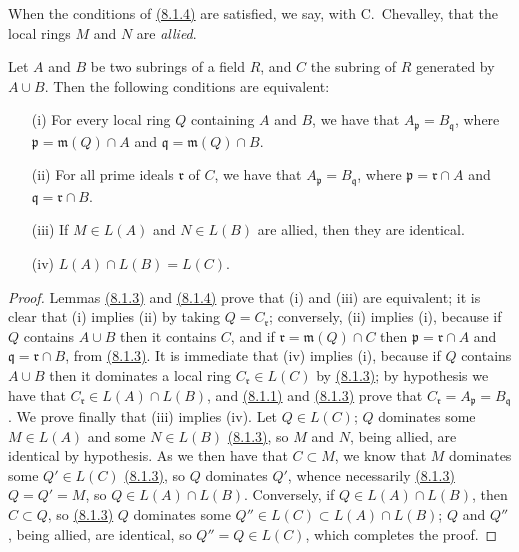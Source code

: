 When the conditions of \hyperref[lem-1.8.1.4]{(8.1.4)} are satisfied, we say, with C.~Chevalley,
that the local rings $M$ and $N$ are {\it allied}.

\begin{prop}[8.1.5]
\label{prop-1.8.1.5}
Let $A$ and $B$ be two subrings of a field $R$,
and $C$ the subring of $R$ generated by $A\cup B$. Then the following
conditions are equivalent:
\begin{itemize}
  \item[{\rm(i)}] For every local ring $Q$ containing $A$ and $B$, we have that
        $A_\mathfrak{p}=B_\mathfrak{q}$, where $\mathfrak{p}=\mathfrak{m}(Q)\cap A$ and
        $\mathfrak{q}=\mathfrak{m}(Q)\cap B$.
  \item[{\rm(ii)}] For all prime ideals $\mathfrak{r}$ of $C$, we have that
        $A_\mathfrak{p}=B_\mathfrak{q}$, where $\mathfrak{p}=\mathfrak{r}\cap A$ and
        $\mathfrak{q}=\mathfrak{r}\cap B$.
  \item[{\rm(iii)}] If $M\in L(A)$ and $N\in L(B)$ are allied, then they are identical.
  \item[{\rm(iv)}] $L(A)\cap L(B)=L(C)$.
\end{itemize}
\end{prop}

\begin{proof}
\label{proof-prop-1.8.1.5}
Lemmas \hyperref[lem-1.8.1.3]{(8.1.3)} and \hyperref[lem-1.8.1.4]{(8.1.4)} prove that (i) and (iii) are equivalent; it
is clear that (i) implies (ii) by taking $Q=C_\mathfrak{r}$; conversely, (ii)
implies (i), because if $Q$ contains $A\cup B$ then it contains $C$, and if
$\mathfrak{r}=\mathfrak{m}(Q)\cap C$ then $\mathfrak{p}=\mathfrak{r}\cap A$ and
$\mathfrak{q}=\mathfrak{r}\cap B$, from \hyperref[lem-1.8.1.3]{(8.1.3)}. It is immediate that (iv)
implies (i), because if $Q$ contains $A\cup B$ then it dominates a local ring
$C_\mathfrak{r}\in L(C)$ by \hyperref[lem-1.8.1.3]{(8.1.3)}; by hypothesis we have that
$C_\mathfrak{r}\in L(A)\cap L(B)$, and \hyperref[lem-1.8.1.1]{(8.1.1)} and \hyperref[lem-1.8.1.3]{(8.1.3)} prove that
$C_\mathfrak{r}=A_\mathfrak{p}=B_\mathfrak{q}$. We prove finally that (iii)
implies (iv). Let $Q\in L(C)$; $Q$ dominates some $M\in L(A)$ and some $N\in
L(B)$ \hyperref[lem-1.8.1.3]{(8.1.3)}, so $M$ and $N$, being allied, are identical by hypothesis.
As we then have that $C\subset M$, we know that $M$ dominates some $Q'\in L(C)$
\hyperref[lem-1.8.1.3]{(8.1.3)}, so $Q$ dominates $Q'$, whence necessarily \hyperref[lem-1.8.1.3]{(8.1.3)} $Q=Q'=M$,
so $Q\in L(A)\cap L(B)$. Conversely, if $Q\in L(A)\cap L(B)$, then $C\subset
Q$, so \hyperref[lem-1.8.1.3]{(8.1.3)} $Q$ dominates some $Q''\in L(C)\subset L(A)\cap L(B)$; $Q$
and $Q''$, being allied, are identical, so $Q''=Q\in L(C)$, which completes the
proof.
\end{proof}

